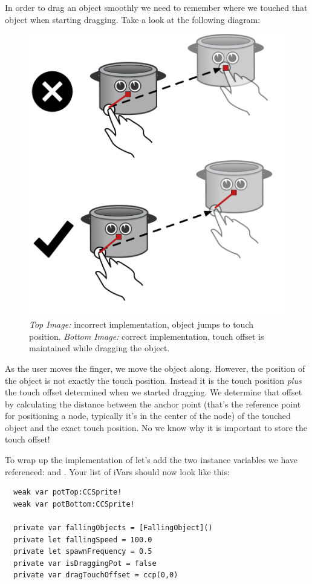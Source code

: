 In order to drag an object smoothly we need to remember where we touched that
object when starting dragging. Take a look at the following diagram:
\begin{figure}[H]
		\centering
		\includegraphics[width=0.4\linewidth]{images/Chapter3/dragging_offset.png}
		\caption{\textit{Top Image:} incorrect implementation, object jumps to touch
		position. \textit{Bottom Image:} correct implementation, touch offset is
		maintained while dragging the object.}
		\label{user_interaction_touch_offset}
\end{figure}
As the user moves the finger, we move the object along. However, the position of
the object is not exactly the touch position. Instead it is the touch position
\textit{plus} the touch offset determined when we started dragging. We determine
that offset by calculating the distance between the anchor point (that's the
reference point for positioning a node, typically it's in the center of the
node) of the touched object and the exact touch position. 
No we know why it is important to store the touch offset!

\begin{leftbar}
To wrap up the implementation of  let's add the two
instance variables we have referenced:  and
. Your list of iVars should now look like this:
\begin{lstlisting}
  weak var potTop:CCSprite!
  weak var potBottom:CCSprite!
  
  private var fallingObjects = [FallingObject]()
  private let fallingSpeed = 100.0
  private let spawnFrequency = 0.5
  private var isDraggingPot = false
  private var dragTouchOffset = ccp(0,0)
\end{lstlisting}
\end{leftbar}

